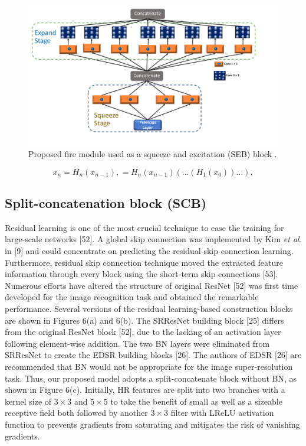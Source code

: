 \documentclass{ieeeaccess}
\begin{document}
\begin{figure}
    \centering

    \includegraphics[width=\linewidth]{5Figure.pdf}
    \caption{Proposed fire module used as a squeeze and excitation (SEB) block .}
    \label{fig:5}
\end{figure}


\begin{equation}
{x_{n}}= {H_{n}}({x_{n-1}}), = {H_{n}}({x_{n-1}})(...({H_{1}}({x_{0}}))...),
\end{equation}
\subsection{Split-concatenation block (SCB)}
Residual learning is one of the most crucial technique to ease the training for large-scale networks [52]. A global skip connection was implemented by Kim \textit{et al.} in [9] and could concentrate on predicting the residual skip connection learning. Furthermore, residual skip connection technique moved the extracted feature information through every block using the short-term skip connections [53]. Numerous efforts have altered the structure of original ResNet [52] was first time developed for the image recognition task and obtained the remarkable performance. Several versions of the residual learning-based construction blocks are shown in Figures 6(a) and 6(b). The SRResNet building block [25]  differs from the original ResNet block [52], due to the lacking of an activation layer following element-wise addition. The two BN layers were eliminated from SRResNet to create the EDSR building blocks [26]. The authors of EDSR [26] are recommended that BN would not be appropriate for the image super-resolution task. Thus, our proposed model adopts a split-concatenate block without BN, as shown in Figure 6(c). Initially, HR features are split into two branches with a kernel size of $3\times3$ and $5\times5$ to take the benefit of small as well as a sizeable receptive field both followed by another $3\times3$ filter with LReLU activation function to prevents gradients from saturating and mitigates the risk of vanishing gradients.
\end{document}
